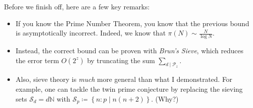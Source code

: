 
\begin{frame}\frametitle{\insertsubsection}
Before we finish off, here are a few key remarks:
\begin{itemize}
  \item If you know the Prime Number Theorem, you know that the previous bound is asymptotically incorrect. Indeed, we know that \(\pi(N) \sim \frac{N}{\log N}\).
  \item Instead, the correct bound can be proven with \textit{Brun's Sieve}, which reduces the error term \(O(2^z)\) by truncating the sum \(\sum_{d \mid \mathscr{P}_z}\).
  \item Also, sieve theory is \textit{much} more general than what I demonstrated. For example, one can tackle the twin prime conjecture by replacing the sieving sets \(\mathcal{S}_d = d\mathbb{N}\) with \(\mathcal{S}_p \coloneqq \left\{n : p \mid n(n + 2)\right\}\). (Why?)
\end{itemize}
\end{frame}
